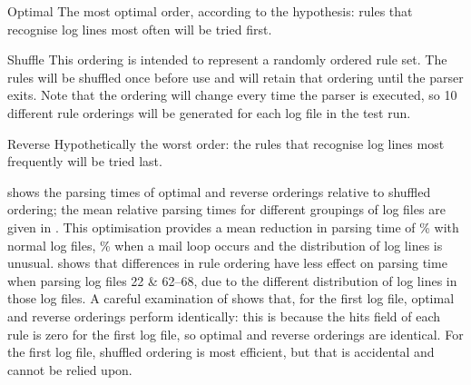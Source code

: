 \begin{eqlist}

    \item [Optimal]  The most optimal order, according to the hypothesis:
        rules that recognise log lines most often will be tried first.

    \item [Shuffle] This ordering is intended to represent a randomly
        ordered rule set.  The rules will be shuffled once before use and
        will retain that ordering until the parser exits.  Note that the
        ordering will change every time the parser is executed, so 10
        different rule orderings will be generated for each log file in the
        test run.

    \item [Reverse] Hypothetically the worst order: the rules that
        recognise log lines most frequently will be tried last.

\end{eqlist}

 shows the
parsing times of optimal and reverse orderings relative to shuffled
ordering; the mean relative parsing times for different groupings of log
files are given in .  This optimisation provides a mean reduction in parsing time of
\%
with normal log files,
\%
when a mail loop occurs and the distribution of log lines is unusual.
 shows that
differences in rule ordering have less effect on parsing time when parsing
log files 22 \& 62--68, due to the different distribution of log lines in
those log files.  A careful examination of  shows that, for the first log file, optimal and
reverse orderings perform identically: this is because the hits field of
each rule is zero for the first log file, so optimal and reverse orderings
are identical.  For the first log file, shuffled ordering is most
efficient, but that is accidental and cannot be relied upon.



